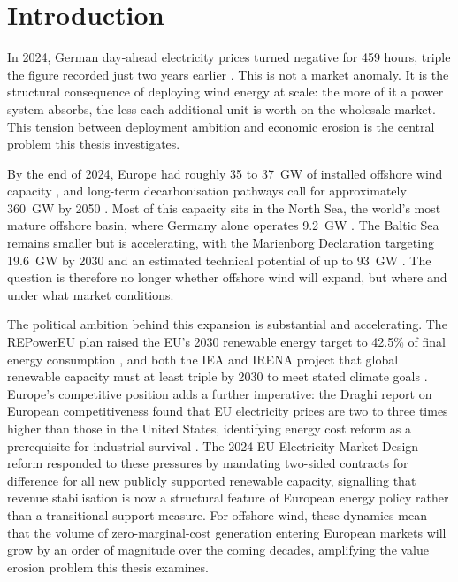 
\section{Introduction}

In 2024, German day-ahead electricity prices turned negative for 459 hours, triple the figure recorded just two years earlier \cite{FfE2025_GermanElectricityPricesEPEX2024}. This is not a market anomaly. It is the structural consequence of deploying wind energy at scale: the more of it a power system absorbs, the less each additional unit is worth on the wholesale market. This tension between deployment ambition and economic erosion is the central problem this thesis investigates.

\vspace{4pt}

By the end of 2024, Europe had roughly 35 to 37~GW of installed offshore wind capacity \cite{Colaluce2025_EuropeOffshoreWind}, and long-term decarbonisation pathways call for approximately 360~GW by 2050 \cite{EuropeanCommission2021_EUReferenceScenario2020}. Most of this capacity sits in the North Sea, the world's most mature offshore basin, where Germany alone operates 9.2~GW \cite{OffshoreWIND2025_GermanyOffshoreCapacity}. The Baltic Sea remains smaller but is accelerating, with the Marienborg Declaration targeting 19.6~GW by 2030 and an estimated technical potential of up to 93~GW \cite{BalticWind2024_BEMIPOffshorePriorities}. The question is therefore no longer whether offshore wind will expand, but where and under what market conditions.

\vspace{4pt}

The political ambition behind this expansion is substantial and accelerating. The REPowerEU plan raised the EU's 2030 renewable energy target to 42.5\% of final energy consumption \cite{REPowerEU2022}, and both the IEA and IRENA project that global renewable capacity must at least triple by 2030 to meet stated climate goals \cite{IEA2024, IRENA2024}. Europe's competitive position adds a further imperative: the Draghi report on European competitiveness found that EU electricity prices are two to three times higher than those in the United States, identifying energy cost reform as a prerequisite for industrial survival \cite{Draghi2024}. The 2024 EU Electricity Market Design reform \cite{EUMarketReform2024} responded to these pressures by mandating two-sided contracts for difference for all new publicly supported renewable capacity, signalling that revenue stabilisation is now a structural feature of European energy policy rather than a transitional support measure. For offshore wind, these dynamics mean that the volume of zero-marginal-cost generation entering European markets will grow by an order of magnitude over the coming decades, amplifying the value erosion problem this thesis examines.

